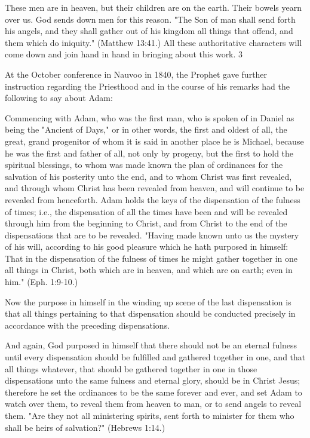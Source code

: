These men are in heaven, but their children are on the earth. Their bowels yearn over us. God
sends down men for this reason. "The Son of man shall send forth his angels, and they shall
gather out of his kingdom all things that offend, and them which do iniquity." (Matthew
13:41.) All these authoritative characters will come down and join hand in hand in bringing
about this work. 3

At the October conference in Nauvoo in 1840, the Prophet gave further instruction regarding
the Priesthood and in the course of his remarks had the following to say about Adam:

Commencing with Adam, who was the first man, who is spoken of in Daniel as being the
"Ancient of Days," or in other words, the first and oldest of all, the great, grand progenitor of
whom it is said in another place he is Michael, because he was the first and father of all, not
only by progeny, but the first to hold the spiritual blessings, to whom was made known the
plan of ordinances for the salvation of his posterity unto the end, and to whom Christ was
first revealed, and through whom Christ has been revealed from heaven, and will continue to
be revealed from henceforth. Adam holds the keys of the dispensation of the fulness of times;
i.e., the dispensation of all the times have been and will be revealed through him from the
beginning to Christ, and from Christ to the end of the dispensations that are to be revealed.
"Having made known unto us the mystery of his will, according to his good pleasure which
he hath purposed in himself: That in the dispensation of the fulness of times he might gather
together in one all things in Christ, both which are in heaven, and which are on earth; even in
him." (Eph. 1:9-10.)

Now the purpose in himself in the winding up scene of the last dispensation is that all things
pertaining to that dispensation should be conducted precisely in accordance with the
preceding dispensations.

And again, God purposed in himself that there should not be an eternal fulness until every
dispensation should be fulfilled and gathered together in one, and that all things whatever,
that should be gathered together in one in those dispensations unto the same fulness and
eternal glory, should be in Christ Jesus; therefore he set the ordinances to be the same forever
and ever, and set Adam to watch over them, to reveal them from heaven to man, or to send
angels to reveal them. "Are they not all ministering spirits, sent forth to minister for them
who shall be heirs of salvation?" (Hebrews 1:14.)

